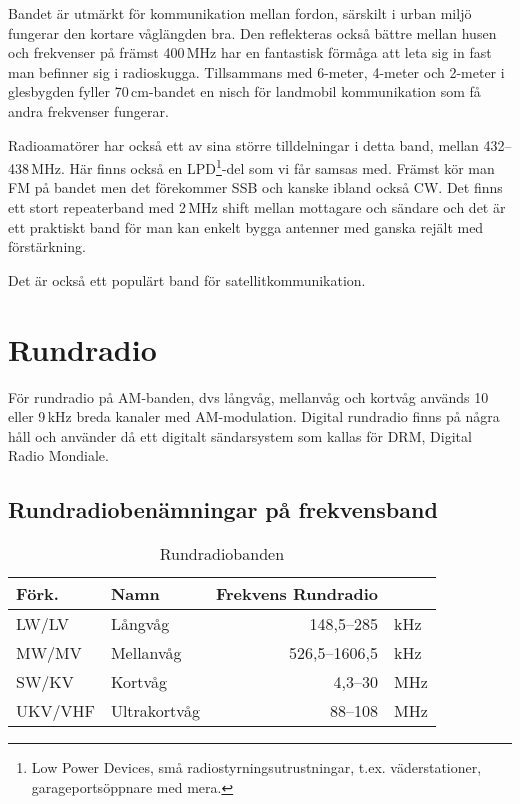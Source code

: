 Bandet är utmärkt för kommunikation mellan fordon, särskilt i urban miljö
fungerar den kortare våglängden bra. Den reflekteras också bättre mellan husen
och frekvenser på främst 400\,MHz har en fantastisk förmåga att leta sig in
fast man befinner sig i radioskugga. Tillsammans med 6-meter, 4-meter och
2-meter i glesbygden fyller 70\,cm-bandet en nisch för landmobil kommunikation
som få andra frekvenser fungerar.

Radioamatörer har också ett av sina större tilldelningar i detta band, mellan
432--438\,MHz. Här finns också en LPD\footnote{Low Power Devices, små
radiostyrningsutrustningar, t.ex. väderstationer, garageportsöppnare med
mera.}-del som vi får samsas med. Främst kör man FM på bandet men det
förekommer SSB och kanske ibland också CW. Det finns ett stort repeaterband
med 2\,MHz shift mellan mottagare och sändare och det är ett praktiskt band
för man kan enkelt bygga antenner med ganska rejält med förstärkning.

Det är också ett populärt band för satellitkommunikation.

\section{Rundradio}

För rundradio på AM-banden, dvs långvåg, mellanvåg och kortvåg används 10
eller 9\,kHz breda kanaler med AM-modulation. Digital rundradio finns på några
håll och använder då ett digitalt sändarsystem som kallas för DRM, Digital
Radio Mondiale.

\subsection{Rundradiobenämningar på frekvensband}
\label{rundradioband}

\begin{table}[H]
\centering
\begin{tabular}{llrl}
	\textbf{Förk.} & \textbf{Namn} & \textbf{Frekvens Rundradio} &     \\ \hline
	LW/LV          & Långvåg       &                  148,5--285 & kHz \\
	MW/MV          & Mellanvåg     &               526,5--1606,5 & kHz \\
	SW/KV          & Kortvåg       &                     4,3--30 & MHz \\
	UKV/VHF        & Ultrakortvåg  &                     88--108 & MHz
\end{tabular}
\caption{Rundradiobanden}
\end{table}

